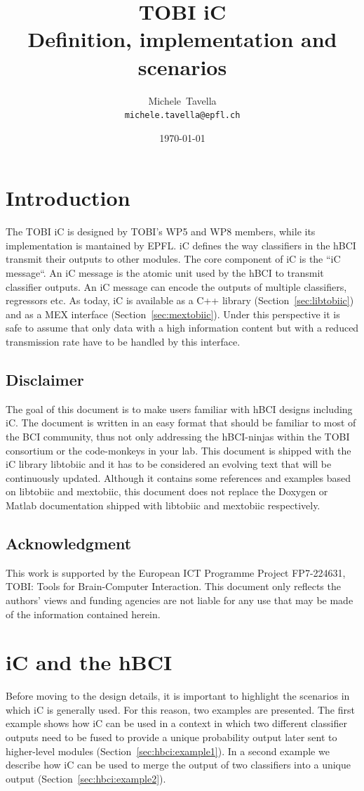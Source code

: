 \documentclass[a4paper,10pt]{article}
\title{TOBI iC\\
\large{Definition, implementation and scenarios}}
\author{Michele~Tavella\\
\footnotesize{\texttt{michele.tavella@epfl.ch}}}
\begin{document}
\date{\today}
\maketitle
\tableofcontents 
\pagebreak

\section{Introduction}
The TOBI iC is designed by TOBI's WP5 and WP8 members, while its implementation
is mantained by EPFL.
iC defines the way classifiers in the hBCI transmit their outputs to other
modules.
The core component of iC is the ``iC message``. An iC message is the atomic
unit used by the hBCI to transmit classifier outputs. 
An iC message can encode the outputs of multiple classifiers, regressors etc.
As today, iC is available as a C++ library (Section~\ref{sec:libtobiic}) and as
a MEX interface (Section~\ref{sec:mextobiic}).
Under this perspective it is safe to assume that only data with a high
information content but with a reduced transmission rate have to be handled by
this interface. 

\subsection{Disclaimer}
\label{sec:disclaimer}
The goal of this document is to make users familiar with hBCI designs including
iC. The document is written in an easy format that should be familiar to most of
the BCI community, thus not only addressing the hBCI-ninjas within the TOBI
consortium or the code-monkeys in your lab.
This document is shipped with the iC library libtobiic and it has to be
considered an evolving text that will be continuously updated.
Although it contains some references and examples based on libtobiic and
mextobiic, this document does not replace the Doxygen or Matlab documentation
shipped with libtobiic and mextobiic respectively.

\subsection{Acknowledgment}
\label{sec:acknowledgment}
This work is supported by the European ICT Programme Project FP7-224631,
TOBI: Tools for Brain-Computer Interaction. This document only reflects the
authors' views and funding agencies are not liable for any use that may
be made of the information contained herein.

\section{iC and the hBCI}
\label{sec:hbci}
Before moving to the design details, it is important to highlight the scenarios
in which iC is generally used. For this reason, two examples are presented.
The first example shows how iC can be used in a context in which two different
classifier outputs need to be fused to provide a unique probability output later
sent to higher-level modules (Section~\ref{sec:hbci:example1}).
In a second example we describe how iC can be used to merge the output of two
classifiers into a unique output (Section~\ref{sec:hbci:example2}).
\end{document}
